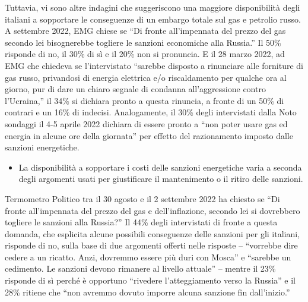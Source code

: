 \documentclass[
  openany]{book}
\providecommand{\tightlist}{%
  \setlength{\itemsep}{0pt}\setlength{\parskip}{0pt}}
\begin{document}
Tuttavia, vi sono altre indagini che suggeriscono una maggiore disponibilità degli italiani a sopportare le conseguenze di un embargo totale sul gas e petrolio russo. A settembre 2022, EMG chiese se ``Di fronte all'impennata del prezzo del gas secondo lei bisognerebbe togliere le sanzioni economiche alla Russia.'' Il 50\% risponde di no, il 30\% di sì e il 20\% non si pronuncia. E il 28 marzo 2022, ad EMG che chiedeva se l'intervistato ``sarebbe disposto a rinunciare alle forniture di gas russo, privandosi di energia elettrica e/o riscaldamento per qualche ora al giorno, pur di dare un chiaro segnale di condanna all'aggressione contro l'Ucraina,'' il 34\% si dichiara pronto a questa rinuncia, a fronte di un 50\% di contrari e un 16\% di indecisi. Analogamente, il 30\% degli intervistati dalla Noto sondaggi il 4-5 aprile 2022 dichiara di essere pronto a ``non poter usare gas ed energia in alcune ore della giornata'' per effetto del razionamento imposto dalle sanzioni energetiche.

\begin{itemize}
\tightlist
\item
  La disponibilità a sopportare i costi delle sanzioni energetiche varia a seconda degli argomenti usati per giustificare il mantenimento o il ritiro delle sanzioni.
\end{itemize}

Termometro Politico tra il 30 agosto e il 2 settembre 2022 ha chiesto se ``Di fronte all'impennata del prezzo del gas e dell'inflazione, secondo lei si dovrebbero togliere le sanzioni alla Russia?'' Il 44\% degli intervistati di fronte a questa domanda, che esplicita alcune possibili conseguenze delle sanzioni per gli italiani, risponde di no, sulla base di due argomenti offerti nelle risposte -- ``vorrebbe dire cedere a un ricatto. Anzi, dovremmo essere più duri con Mosca'' e ``sarebbe un cedimento. Le sanzioni devono rimanere al livello attuale'' -- mentre il 23\% risponde di sì perché è opportuno ``rivedere l'atteggiamento verso la Russia'' e il 28\% ritiene che ``non avremmo dovuto imporre alcuna sanzione fin dall'inizio.''
\end{document}
